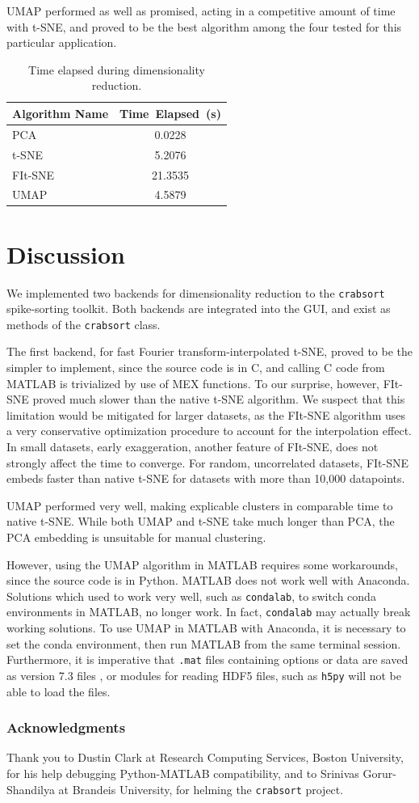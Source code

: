 \documentclass{article}
\begin{document}
UMAP performed as well as promised, acting in a competitive amount of time with t-SNE,
and proved to be the best algorithm among the four tested for this particular application.

\begin{table}
  \caption{Time elapsed during dimensionality reduction.}
  \label{tbl:dim-red-time}
  \centering
  \begin{tabular}{lS}
    \toprule
    Algorithm Name     & Time~Elapsed~(s) \\
    \midrule
    PCA     & 0.0228 \\
    t-SNE   & 5.2076 \\
    FIt-SNE & 21.3535 \\
    UMAP    & 4.5879 \\
    \bottomrule
  \end{tabular}
\end{table}

\section{Discussion}

We implemented two backends for dimensionality reduction to the \texttt{crabsort}
spike-sorting toolkit.
Both backends are integrated into the GUI,
and exist as methods of the \texttt{crabsort} class.

The first backend, for fast Fourier transform-interpolated t-SNE,
proved to be the simpler to implement, since the source code is in C,
and calling C code from MATLAB is trivialized by use of MEX functions.
To our surprise, however, FIt-SNE proved much slower than the native t-SNE
algorithm.
We suspect that this limitation would be mitigated for larger datasets,
as the FIt-SNE algorithm uses a very conservative optimization procedure
to account for the interpolation effect.
In small datasets, early exaggeration, another feature of FIt-SNE, does not strongly
affect the time to converge.
For random, uncorrelated datasets, FIt-SNE embeds faster than native t-SNE
for datasets with more than 10,000 datapoints.

UMAP performed very well, making explicable clusters in comparable time to native t-SNE.
While both UMAP and t-SNE take much longer than PCA,
the PCA embedding is unsuitable for manual clustering.

However, using the UMAP algorithm in MATLAB requires some workarounds,
since the source code is in Python.
MATLAB does not work well with Anaconda.
Solutions which used to work very well, such as \texttt{condalab},
to switch conda environments in MATLAB, no longer work.
In fact, \texttt{condalab} may actually break working solutions.
To use UMAP in MATLAB with Anaconda, it is necessary to set the conda environment,
then run MATLAB from the same terminal session.
Furthermore, it is imperative that \texttt{.mat} files containing options or data
are saved as version 7.3 files \cite{MATFileLevelFile2015},
or modules for reading HDF5 files, such as \texttt{h5py} will not be able to load the files.

\subsubsection*{Acknowledgments}

Thank you to Dustin Clark at Research Computing Services, Boston University,
for his help debugging Python-MATLAB compatibility,
and to Srinivas Gorur-Shandilya at Brandeis University,
for helming the \texttt{crabsort} project.

\printbibliography
\end{document}
